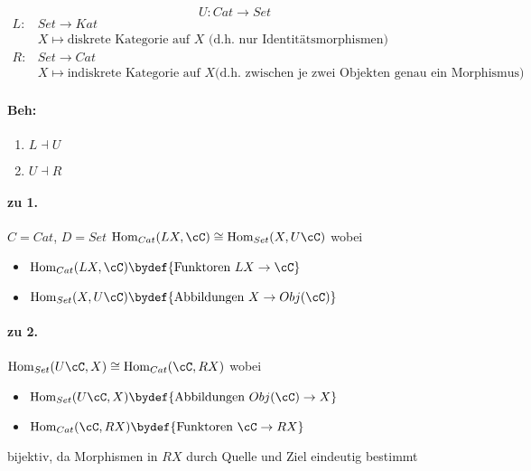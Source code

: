 \begin{exmp}
\[
U:Cat \rightarrow Set
\]
\begin{align*}
L: & Set \rightarrow Kat\\
  & X \mapsto \mbox{diskrete Kategorie auf $X$ (d.h. nur
Identitätsmorphismen)}\\
R: & Set \rightarrow Cat\\
  & X \mapsto \mbox{indiskrete Kategorie auf $X$(d.h. zwischen je zwei
Objekten genau ein Morphismus)}
\end{align*}
\paragraph{Beh:}
\begin{enumerate}
\item $L\dashv U$
\item $U\dashv R$
\end{enumerate}
\paragraph{zu 1.} $C=Cat$, $D=Set$
$\Hom_{Cat}(LX,\cC)\cong\Hom_{Set}(X,U\cC)$
wobei
\begin{itemize}
\item 
$\Hom_{Cat}(LX,\cC)\bydef\{\mbox{Funktoren }LX\rightarrow \cC \}$
\item 
$\Hom_{Set}(X,U\cC)\bydef\{\mbox{Abbildungen } X\rightarrow Obj(\cC)\}$
\end{itemize}
\paragraph{zu 2.}
$\Hom_{Set}(U\cC,X)\cong\Hom_{Cat}(\cC,RX)$
wobei
\begin{itemize}
\item 
$\Hom_{Set}(U\cC,X)\bydef\{\mbox{Abbildungen } Obj(\cC)\rightarrow X\}$
\item 
$\Hom_{Cat}(\cC,RX)\bydef\{\mbox{Funktoren }\cC\rightarrow RX \}$
\end{itemize}
bijektiv, da Morphismen in $RX$ durch Quelle und Ziel eindeutig bestimmt
\end{exmp}
